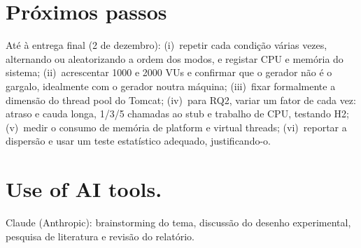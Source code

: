\documentclass[sigplan]{acmart}
\begin{document}
\section{Próximos passos}
Até à entrega final (2 de dezembro): (i)~repetir cada condição várias vezes, alternando ou aleatorizando a ordem dos modos, e registar CPU e memória do sistema; (ii)~acrescentar 1000 e 2000 VUs e confirmar que o gerador não é o gargalo, idealmente com o gerador noutra máquina; (iii)~fixar formalmente a dimensão do thread pool do Tomcat; (iv)~para RQ2, variar um fator de cada vez: atraso e cauda longa, 1/3/5 chamadas ao stub e trabalho de CPU, testando H2; (v)~medir o consumo de memória de platform e virtual threads; (vi)~reportar a dispersão e usar um teste estatístico adequado, justificando-o.

\section{Use of AI tools.}
 Claude (Anthropic): brainstorming do tema,
discussão do desenho experimental, pesquisa de literatura e
revisão do relatório.





\end{document}

